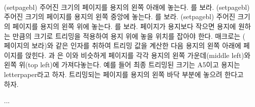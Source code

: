 \begin{syntax}
\cmd{\setpagebl} \\
\cmd{\setpageml} \\
\cmd{\setpagetl} \\
\end{syntax}
\glossary(setpagebl)%
  {}%
  {주어진 크기의 페이지를 용지의 왼쪽 아래에 놓는다. 를 보라.}
\glossary(setpagebl)%
  {}%
  {주어진 크기의 페이지를 용지의 왼쪽 중앙에 놓는다. 를 보라.}
\glossary(setpagebl)%
  {}%
  {주어진 크기의 페이지를 용지의 왼쪽 위에 놓는다. 를 보라.}
페이지가 용지보다 작으면 용지에 원하는 만큼의 크기로 트리밍을 적용하여
용지 위에 놓을 위치를 잡아야 한다.
\cmd{\setpagebl} 매크로는 \cmd{\settrimmedsize} (\pageref{tab:rectsize} 페이지의 \를 보라)와 같은 인자를 취하여 트리밍 값을 계산한 다음 용지의 왼쪽 아래에 페이지를 앉힌다. 
\cmd{\setpageml}과 \cmd{\setpagetl}은 이와 비슷하게 페이지를 각각 용지의 왼쪽 가운데(middle left)와 왼쪽 위(top left)에 가져다놓는다. 
예를 들어 최종 트리밍된 크기는 A5이고 용지는 letterpaper라고 하자. 트리밍되는 페이지를 용지의 왼쪽 바닥 부분에 놓으려 한다고 하자.
\begin{lcode}
\pagebv %
\setpagebl{\paperheight}{\paperwidth}{*}
...
\checkandfixthelayout
\end{lcode}
